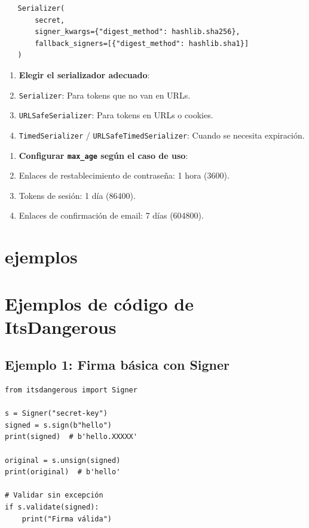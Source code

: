 \documentclass[11pt,a4paper]{article}
\begin{document}
\begin{lstlisting}
   Serializer(
       secret,
       signer_kwargs={"digest_method": hashlib.sha256},
       fallback_signers=[{"digest_method": hashlib.sha1}]
   )
\end{lstlisting}


\begin{enumerate}[leftmargin=*,topsep=2pt,itemsep=1pt]
  \item \textbf{Elegir el serializador adecuado}:
  \item \texttt{Serializer}: Para tokens que no van en URLs.
  \item \texttt{URLSafeSerializer}: Para tokens en URLs o cookies.
  \item \texttt{TimedSerializer} / \texttt{URLSafeTimedSerializer}: Cuando se necesita expiración.
\end{enumerate}


\begin{enumerate}[leftmargin=*,topsep=2pt,itemsep=1pt]
  \item \textbf{Configurar \texttt{max\_age} según el caso de uso}:
  \item Enlaces de restablecimiento de contraseña: 1 hora (3600).
  \item Tokens de sesión: 1 día (86400).
  \item Enlaces de confirmación de email: 7 días (604800).
\end{enumerate}


\section*{ejemplos}

\section*{Ejemplos de código de ItsDangerous}


\subsection*{Ejemplo 1: Firma básica con Signer}


\begin{lstlisting}
from itsdangerous import Signer

s = Signer("secret-key")
signed = s.sign(b"hello")
print(signed)  # b'hello.XXXXX'

original = s.unsign(signed)
print(original)  # b'hello'

# Validar sin excepción
if s.validate(signed):
    print("Firma válida")
\end{lstlisting}
\end{document}
